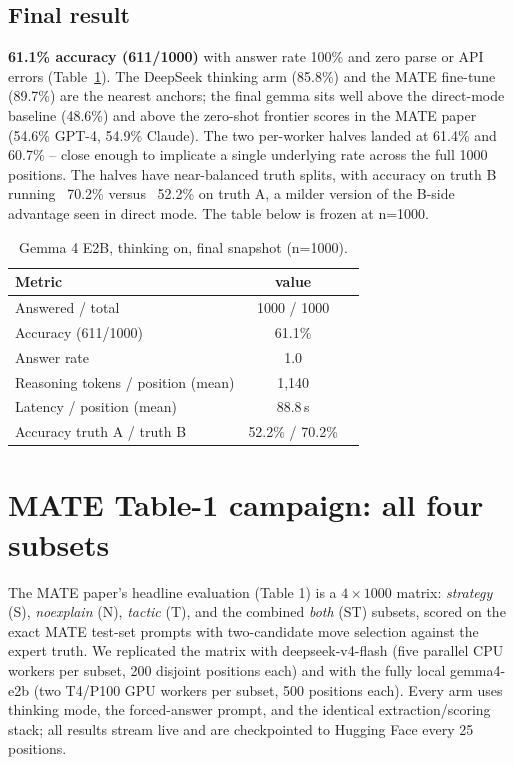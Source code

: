 \documentclass{article}
\begin{document}
\subsection{Final result}
\textbf{61.1\% accuracy (611/1000)} with answer rate 100\% and zero parse
or API errors (Table~\ref{tab:gemma}). The DeepSeek thinking arm (85.8\%)
and the MATE fine-tune (89.7\%) are the nearest anchors; the final gemma
sits well above the direct-mode baseline (48.6\%) and above the
zero-shot frontier scores in the MATE paper (54.6\% GPT-4, 54.9\%
Claude). The two per-worker halves landed at 61.4\% and 60.7\% -- close
enough to implicate a single underlying rate across the full 1000
positions. The halves have near-balanced truth splits, with accuracy on
truth B running ~70.2\% versus ~52.2\% on truth A, a milder version of
the B-side advantage seen in direct mode. The table below is frozen at
n=1000.

\begin{table}[h]
\centering
\begin{tabular}{lcc}
\hline
Metric & value \\ \hline
Answered / total & 1000 / 1000 \\
Accuracy (611/1000) & 61.1\% \\
Answer rate & 1.0 \\
Reasoning tokens / position (mean) & 1,140 \\
Latency / position (mean) & 88.8\,s \\
Accuracy truth A / truth B & 52.2\% / 70.2\% \\
\hline
\end{tabular}
\caption{Gemma 4 E2B, thinking on, final snapshot (n=1000).}
\label{tab:gemma}
\end{table}

\section{MATE Table-1 campaign: all four subsets}
\label{sec:campaign}
The MATE paper's headline evaluation (Table 1) is a $4\times1000$
matrix: \emph{strategy} (S), \emph{noexplain} (N), \emph{tactic} (T),
and the combined \emph{both} (ST) subsets, scored on the exact MATE
test-set prompts with two-candidate move selection against the expert
truth. We replicated the matrix with deepseek-v4-flash (five parallel
CPU workers per subset, 200 disjoint positions each) and with the fully
local gemma4-e2b (two T4/P100 GPU workers per subset, 500 positions
each). Every arm uses thinking mode, the forced-answer prompt, and the
identical extraction/scoring stack; all results stream live and are
checkpointed to Hugging Face every 25 positions.
\end{document}
